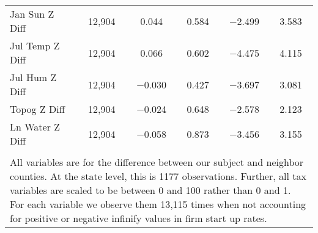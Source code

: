 \begin{table}[!htbp]
\begin{tabular}{@{\extracolsep{5pt}}lccccc}
Jan Sun Z Diff & 12,904 & 0.044 & 0.584 & $-$2.499 & 3.583 \\ 
Jul Temp Z Diff & 12,904 & 0.066 & 0.602 & $-$4.475 & 4.115 \\ 
Jul Hum Z Diff & 12,904 & $-$0.030 & 0.427 & $-$3.697 & 3.081 \\ 
Topog Z Diff & 12,904 & $-$0.024 & 0.648 & $-$2.578 & 2.123 \\ 
Ln Water Z Diff & 12,904 & $-$0.058 & 0.873 & $-$3.456 & 3.155 \\ 
\hline \\[-1.8ex] 
\multicolumn{6}{l}{All variables are for the difference between our subject and neighbor counties. At the state level, this is 1177 observations. Further, all tax variables are scaled to be between 0 and 100 rather than 0 and 1. For each variable we observe them 13,115 times when not accounting for positive or negative infinify values in firm start up rates.} \\ 
\end{tabular} 
\end{table} 
